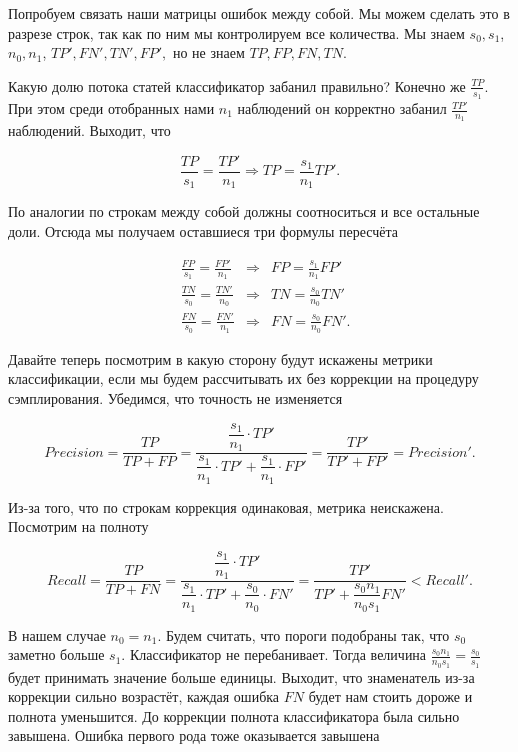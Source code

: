 \documentclass[12pt, a4paper, oneside]{article}
\begin{document}
Попробуем связать наши матрицы ошибок между собой. Мы можем сделать это в разрезе строк, так как по ним мы контролируем все количества. Мы знаем $s_0, s_1$, $n_0, n_1$, $TP', FN', TN', FP',$ но не знаем $TP, FP, FN, TN.$ 

Какую долю потока статей классификатор забанил правильно? Конечно же $\frac{TP}{s_1}.$ При этом среди отобранных нами $n_1$ наблюдений он корректно забанил $\frac{TP'}{n_1}$ наблюдений. Выходит, что 

\[
\frac{TP}{s_1} = \frac{TP'}{n_1}  \Rightarrow TP =  \frac{s_1}{n_1} TP'.
\]

По аналогии по строкам между собой должны соотноситься и все остальные доли. Отсюда мы получаем оставшиеся три формулы пересчёта 

\begin{equation*} 
\begin{aligned} 
&\frac{FP}{s_1} = \frac{FP'}{n_1} & \Rightarrow &  FP =  \frac{s_1}{n_1} FP' \\
&\frac{TN}{s_0} = \frac{TN'}{n_0} &  \Rightarrow &  TN =  \frac{s_0}{n_0} TN' \\ 
&\frac{FN}{s_0} = \frac{FN'}{n_1} & \Rightarrow &  FN =  \frac{s_0}{n_0} FN'.
\end{aligned} 
\end{equation*} 

Давайте теперь посмотрим в какую сторону будут искажены метрики классификации, если мы будем рассчитывать их без коррекции на процедуру сэмплирования. Убедимся, что точность не изменяется

\[
Precision = \frac{TP}{TP + FP} = \frac{\dfrac{s_1}{n_1} \cdot TP'}{\dfrac{s_1}{n_1} \cdot TP' + \dfrac{s_1}{n_1} \cdot  FP'} = \frac{TP'}{TP' + FP'} = Precision'.
\]

Из-за того, что по строкам коррекция одинаковая, метрика неискажена. Посмотрим на полноту 

\[
Recall = \frac{TP}{TP + FN} = \frac{\dfrac{s_1}{n_1} \cdot TP'}{\dfrac{s_1}{n_1} \cdot TP' + \dfrac{s_0}{n_0} \cdot  FN'} = \frac{TP'}{TP' + \dfrac{s_0 n_1}{n_0 s_1} FN'} < Recall'.
\]

В нашем случае $n_0 = n_1$. Будем считать, что пороги подобраны так, что $s_0$ заметно больше $s_1$. Классификатор не перебанивает. Тогда величина $\frac{s_0 n_1}{n_0 s_1} = \frac{s_0}{s_1}$ будет принимать значение больше единицы. Выходит, что знаменатель из-за коррекции сильно возрастёт, каждая ошибка $FN$ будет нам стоить дороже и полнота уменьшится. До коррекции полнота классификатора была сильно завышена. Ошибка первого рода тоже оказывается завышена
\end{document}
